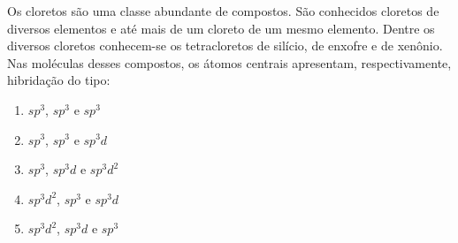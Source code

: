 Os cloretos são uma classe abundante de compostos. São conhecidos cloretos de diversos elementos e até mais de um cloreto de um mesmo elemento. Dentre os diversos cloretos conhecem-se os tetracloretos de silício, de enxofre e de xenônio. Nas moléculas desses compostos, os átomos centrais apresentam, respectivamente, hibridação do tipo:

\begin{enumerate}[label = (\scalealph{\alph*})]
	\item $sp^3$, $sp^3$ e $sp^3$
	\item $sp^3$, $sp^3$ e $sp^3d$
	\item $sp^3$, $sp^3d$ e $sp^3d^2$
	\item $sp^3d^2$, $sp^3$ e $sp^3d$
	\item $sp^3d^2$, $sp^3d$ e $sp^3$
\end{enumerate}
